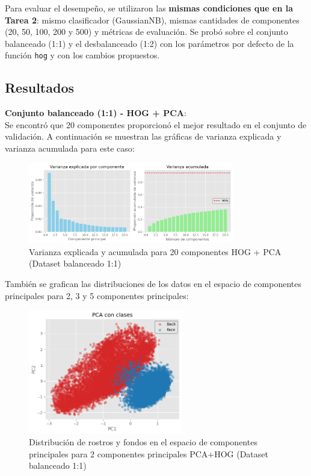 \documentclass{article}
\begin{document}
Para evaluar el desempeño, se utilizaron las \textbf{mismas condiciones que en la Tarea 2}: mismo clasificador (GaussianNB), mismas cantidades de componentes (20, 50, 100, 200 y 500) y métricas de evaluación. Se probó sobre el conjunto balanceado (1:1) y el desbalanceado (1:2) con los parámetros por defecto de la función \texttt{hog} y con los cambios propuestos.

\subsection*{Resultados}

\textbf{Conjunto balanceado (1:1) - HOG + PCA}:\\

Se encontró que 20 componentes proporcionó el mejor resultado en el conjunto de validación. A continuación se muestran las gráficas de varianza explicada y varianza acumulada para este caso:

\begin{figure}[H]
    \centering
    \includegraphics[width=0.8\textwidth]{tarea_4/imagenes/variance_x1_v1_20.png}
    \caption{Varianza explicada y acumulada para 20 componentes HOG + PCA (Dataset balanceado 1:1)}
    \label{fig:hog_pca_variance_x1}
\end{figure}

También se grafican las distribuciones de los datos en el espacio de componentes principales para 2, 3 y 5 componentes principales:

\begin{figure}[H]
    \centering
    \includegraphics[width=0.6\textwidth]{tarea_4/imagenes/pca_classes_x1_v1_20_2_components.png}
    \caption{Distribución de rostros y fondos en el espacio de componentes principales para 2 componentes principales PCA+HOG (Dataset balanceado 1:1)}
    \label{fig:pca_classes}
\end{figure}
\end{document}
